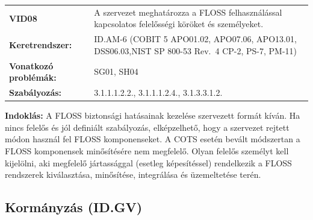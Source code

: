 \documentclass[12pt,magyar,a4paper,oneside]{scrreprt}
\begin{document}
\begin{longtable}[]{@{}ll@{}}
\toprule
\endhead
\begin{minipage}[t]{0.16\columnwidth}\raggedright
\textbf{VID08}\strut
\end{minipage} & \begin{minipage}[t]{0.79\columnwidth}\raggedright
A szervezet meghatározza a FLOSS felhasználással kapcsolatos felelősségi
köröket és személyeket.\strut
\end{minipage}\tabularnewline
\begin{minipage}[t]{0.16\columnwidth}\raggedright
\textbf{Keretrendszer:}\strut
\end{minipage} & \begin{minipage}[t]{0.79\columnwidth}\raggedright
ID.AM-6 (COBIT 5 APO01.02, APO07.06, APO13.01, DSS06.03,NIST SP 800-53
Rev.~4 CP-2, PS-7, PM-11)\strut
\end{minipage}\tabularnewline
\begin{minipage}[t]{0.16\columnwidth}\raggedright
\textbf{Vonatkozó problémák:}\strut
\end{minipage} & \begin{minipage}[t]{0.79\columnwidth}\raggedright
SG01, SH04\strut
\end{minipage}\tabularnewline
\begin{minipage}[t]{0.16\columnwidth}\raggedright
\textbf{Szabályozás:}\strut
\end{minipage} & \begin{minipage}[t]{0.79\columnwidth}\raggedright
3.1.1.1.2.2., 3.1.1.1.2.4., 3.1.3.3.1.2.\strut
\end{minipage}\tabularnewline
\bottomrule
\end{longtable}

\textbf{Indoklás: } A FLOSS biztonsági hatásainak kezelése szervezett
formát kíván. Ha nincs felelős és jól definiált szabályozás,
elképzelhető, hogy a szervezet rejtett módon használ fel FLOSS
komponenseket. A COTS esetén bevált módszertan a FLOSS komponensek
minősítésére nem megfelelő. Olyan felelős személyt kell kijelölni, aki
megfelelő jártassággal (esetleg képesítéssel) rendelkezik a FLOSS
rendszerek kiválasztása, minősítése, integrálása és üzemeltetése terén.

\hypertarget{kormuxe1nyzuxe1s-id.gv}{%
\subsection{Kormányzás (ID.GV)}\label{kormuxe1nyzuxe1s-id.gv}}
\end{document}
